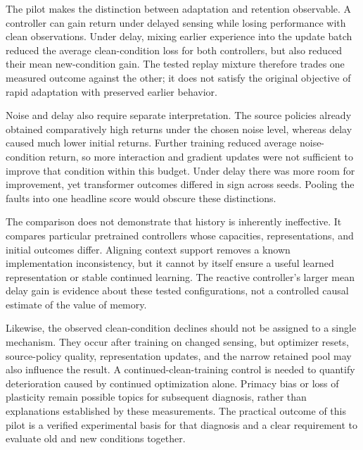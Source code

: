 The pilot makes the distinction between adaptation and retention observable. A controller can gain return under delayed sensing while losing performance with clean observations. Under delay, mixing earlier experience into the update batch reduced the average clean-condition loss for both controllers, but also reduced their mean new-condition gain. The tested replay mixture therefore trades one measured outcome against the other; it does not satisfy the original objective of rapid adaptation with preserved earlier behavior.

Noise and delay also require separate interpretation. The source policies already obtained comparatively high returns under the chosen noise level, whereas delay caused much lower initial returns. Further training reduced average noise-condition return, so more interaction and gradient updates were not sufficient to improve that condition within this budget. Under delay there was more room for improvement, yet transformer outcomes differed in sign across seeds. Pooling the faults into one headline score would obscure these distinctions.

The comparison does not demonstrate that history is inherently ineffective. It compares particular pretrained controllers whose capacities, representations, and initial outcomes differ. Aligning context support removes a known implementation inconsistency, but it cannot by itself ensure a useful learned representation or stable continued learning. The reactive controller's larger mean delay gain is evidence about these tested configurations, not a controlled causal estimate of the value of memory.

Likewise, the observed clean-condition declines should not be assigned to a single mechanism. They occur after training on changed sensing, but optimizer resets, source-policy quality, representation updates, and the narrow retained pool may also influence the result. A continued-clean-training control is needed to quantify deterioration caused by continued optimization alone. Primacy bias or loss of plasticity remain possible topics for subsequent diagnosis, rather than explanations established by these measurements. The practical outcome of this pilot is a verified experimental basis for that diagnosis and a clear requirement to evaluate old and new conditions together.
